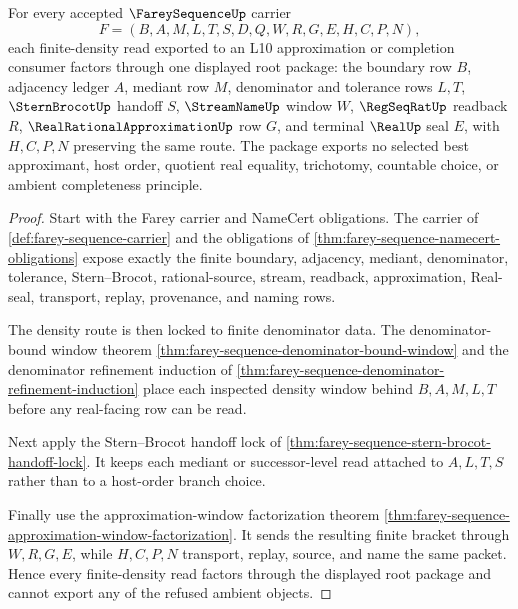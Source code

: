 \begin{theorem}
\label{thm:farey-sequence-finite-density-root-package}
For every accepted $\FareySequenceUp$ carrier
$$
F=(B,A,M,L,T,S,D,Q,W,R,G,E,H,C,P,N),
$$
each finite-density read exported to an L10 approximation or completion consumer factors through one displayed root package: the boundary row $B$, adjacency ledger $A$, mediant row $M$, denominator and tolerance rows $L,T$, $\SternBrocotUp$ handoff $S$, $\StreamNameUp$ window $W$, $\RegSeqRatUp$ readback $R$, $\RealRationalApproximationUp$ row $G$, and terminal $\RealUp$ seal $E$, with $H,C,P,N$ preserving the same route. The package exports no selected best approximant, host order, quotient real equality, trichotomy, countable choice, or ambient completeness principle.
\end{theorem}
\begin{proof}
Start with the Farey carrier and NameCert obligations. The carrier of \autoref{def:farey-sequence-carrier} and the obligations of \autoref{thm:farey-sequence-namecert-obligations} expose exactly the finite boundary, adjacency, mediant, denominator, tolerance, Stern--Brocot, rational-source, stream, readback, approximation, Real-seal, transport, replay, provenance, and naming rows.

The density route is then locked to finite denominator data. The denominator-bound window theorem \autoref{thm:farey-sequence-denominator-bound-window} and the denominator refinement induction of \autoref{thm:farey-sequence-denominator-refinement-induction} place each inspected density window behind $B,A,M,L,T$ before any real-facing row can be read.

Next apply the Stern--Brocot handoff lock of \autoref{thm:farey-sequence-stern-brocot-handoff-lock}. It keeps each mediant or successor-level read attached to $A,L,T,S$ rather than to a host-order branch choice.

Finally use the approximation-window factorization theorem \autoref{thm:farey-sequence-approximation-window-factorization}. It sends the resulting finite bracket through $W,R,G,E$, while $H,C,P,N$ transport, replay, source, and name the same packet. Hence every finite-density read factors through the displayed root package and cannot export any of the refused ambient objects.
\end{proof}
